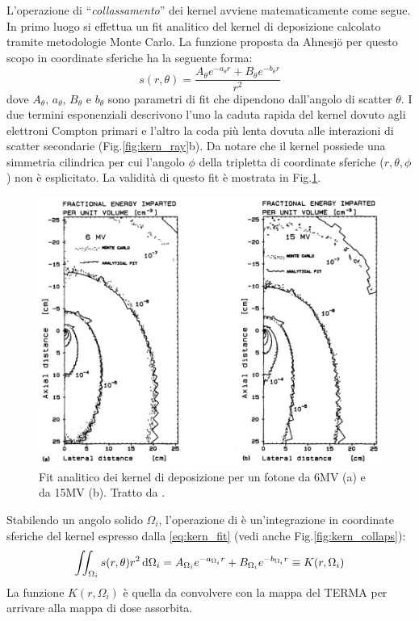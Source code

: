 {L'operazione di \textquotedblleft\textit{collassamento}\textquotedblright{} dei kernel avviene matematicamente come segue. In primo luogo si effettua un fit analitico del kernel di deposizione calcolato tramite metodologie Monte Carlo. La funzione proposta da Ahnesj\"{o} per questo scopo in coordinate sferiche ha la seguente forma:
\begin{equation}
\label{eq:kern_fit}
s(r,\theta) = \frac{A_\theta e^{-a_\theta r} + B_\theta e^{-b_\theta r}}{r^2}
\end{equation}
dove $A_\theta,\,a_\theta,\,B_\theta$ e $b_\theta$ sono parametri di fit che dipendono dall'angolo di scatter $\theta$. I due termini esponenziali descrivono l'uno la caduta rapida del kernel dovuto agli elettroni Compton primari e l'altro la coda più lenta dovuta alle interazioni di scatter secondarie (Fig.\ref{fig:kern_ray}b). Da notare che il kernel possiede una simmetria cilindrica per cui l'angolo $\phi$ della tripletta di coordinate sferiche ($r,\theta,\phi$) non è esplicitato. La validità di questo fit è mostrata in Fig.\ref{fig:kern_fit}.
\begin{figure}
\centering
\includegraphics[width=.8\textwidth]{./cap1/kern_fit.png}
\caption{Fit analitico dei kernel di deposizione per un fotone da 6MV (a) e da 15MV (b). Tratto da \cite{Ahnesjo1989}.}
\label{fig:kern_fit}
\end{figure}

Stabilendo un angolo solido $\Omega_i$, l'operazione di  è un'integrazione in coordinate sferiche del kernel espresso dalla \eqref{eq:kern_fit} (vedi anche Fig.\ref{fig:kern_collaps}):
\begin{equation}
\iint_{\Omega_i} s(r,\theta) r^2\,\text{d} \Omega_i = A_{\Omega_i} e^{-a_{\Omega_i} r} + B_{\Omega_i} e^{-b_{\Omega_i} r} \equiv K(r,\Omega_i)
\end{equation}
La funzione $K(r,\Omega_i)$ è quella da convolvere con la mappa del TERMA per arrivare alla mappa di dose assorbita.

}
